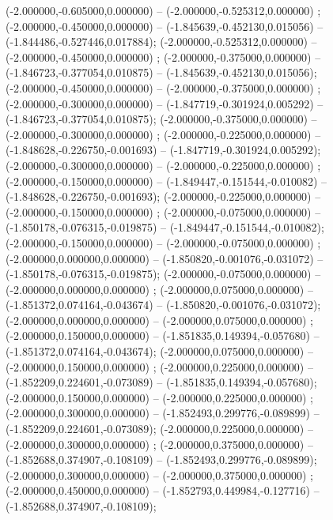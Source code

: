  (-2.000000,-0.605000,0.000000) -- (-2.000000,-0.525312,0.000000) ;
 (-2.000000,-0.450000,0.000000) -- (-1.845639,-0.452130,0.015056) -- (-1.844486,-0.527446,0.017884);
 (-2.000000,-0.525312,0.000000) -- (-2.000000,-0.450000,0.000000) ;
 (-2.000000,-0.375000,0.000000) -- (-1.846723,-0.377054,0.010875) -- (-1.845639,-0.452130,0.015056);
 (-2.000000,-0.450000,0.000000) -- (-2.000000,-0.375000,0.000000) ;
 (-2.000000,-0.300000,0.000000) -- (-1.847719,-0.301924,0.005292) -- (-1.846723,-0.377054,0.010875);
 (-2.000000,-0.375000,0.000000) -- (-2.000000,-0.300000,0.000000) ;
 (-2.000000,-0.225000,0.000000) -- (-1.848628,-0.226750,-0.001693) -- (-1.847719,-0.301924,0.005292);
 (-2.000000,-0.300000,0.000000) -- (-2.000000,-0.225000,0.000000) ;
 (-2.000000,-0.150000,0.000000) -- (-1.849447,-0.151544,-0.010082) -- (-1.848628,-0.226750,-0.001693);
 (-2.000000,-0.225000,0.000000) -- (-2.000000,-0.150000,0.000000) ;
 (-2.000000,-0.075000,0.000000) -- (-1.850178,-0.076315,-0.019875) -- (-1.849447,-0.151544,-0.010082);
 (-2.000000,-0.150000,0.000000) -- (-2.000000,-0.075000,0.000000) ;
 (-2.000000,0.000000,0.000000) -- (-1.850820,-0.001076,-0.031072) -- (-1.850178,-0.076315,-0.019875);
 (-2.000000,-0.075000,0.000000) -- (-2.000000,0.000000,0.000000) ;
 (-2.000000,0.075000,0.000000) -- (-1.851372,0.074164,-0.043674) -- (-1.850820,-0.001076,-0.031072);
 (-2.000000,0.000000,0.000000) -- (-2.000000,0.075000,0.000000) ;
 (-2.000000,0.150000,0.000000) -- (-1.851835,0.149394,-0.057680) -- (-1.851372,0.074164,-0.043674);
 (-2.000000,0.075000,0.000000) -- (-2.000000,0.150000,0.000000) ;
 (-2.000000,0.225000,0.000000) -- (-1.852209,0.224601,-0.073089) -- (-1.851835,0.149394,-0.057680);
 (-2.000000,0.150000,0.000000) -- (-2.000000,0.225000,0.000000) ;
 (-2.000000,0.300000,0.000000) -- (-1.852493,0.299776,-0.089899) -- (-1.852209,0.224601,-0.073089);
 (-2.000000,0.225000,0.000000) -- (-2.000000,0.300000,0.000000) ;
 (-2.000000,0.375000,0.000000) -- (-1.852688,0.374907,-0.108109) -- (-1.852493,0.299776,-0.089899);
 (-2.000000,0.300000,0.000000) -- (-2.000000,0.375000,0.000000) ;
 (-2.000000,0.450000,0.000000) -- (-1.852793,0.449984,-0.127716) -- (-1.852688,0.374907,-0.108109);

